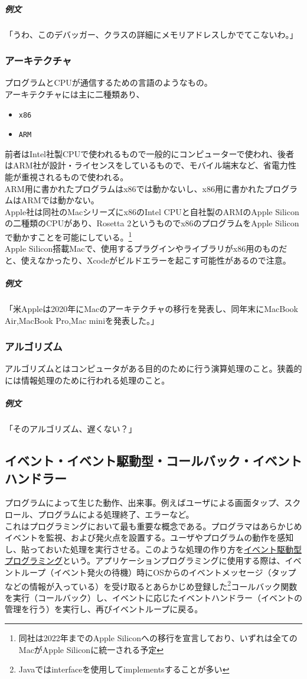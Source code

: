 \documentclass[dvipdfmx,jb5]{jreport}
\newcommand{\terlogy}[2][|]{\colorbox{terlogy}{\texttt{\lstinline#1#2#1}}}
\begin{document}
\subparagraph{例文} 「うわ、このデバッガー、クラスの詳細にメモリアドレスしかでてこないわ。」

\subsubsection{アーキテクチャ}
プログラムとCPUが通信するための言語のようなもの。\\
アーキテクチャには主に二種類あり、
\begin{itemize}
      \item \terlogy{x86}
      \item \terlogy{ARM}
\end{itemize}
前者はIntel社製CPUで使われるもので一般的にコンピューターで使われ、後者はARM社が設計・ライセンスをしているもので、モバイル端末など、省電力性能が重視されるもので使われる。\\
ARM用に書かれたプログラムはx86では動かないし、x86用に書かれたプログラムはARMでは動かない。\\
Apple社は同社のMacシリーズにx86のIntel CPUと自社製のARMのApple Siliconの二種類のCPUがあり、Rosetta 2というものでx86のプログラムをApple Siliconで動かすことを可能にしている。\footnote{同社は2022年までのApple Siliconへの移行を宣言しており、いずれは全てのMacがApple Siliconに統一される予定}\\
Apple Silicon搭載Macで、使用するプラグインやライブラリがx86用のものだと、使えなかったり、Xcodeがビルドエラーを起こす可能性があるので注意。

\subparagraph{例文} 「米Appleは2020年にMacのアーキテクチャの移行を発表し、同年末にMacBook Air,MacBook Pro,Mac miniを発表した。」

\subsubsection{アルゴリズム}
アルゴリズムとはコンピュータがある目的のために行う演算処理のこと。狭義的には情報処理のために行われる処理のこと。

\subparagraph{例文} 「そのアルゴリズム、遅くない？」

\subsection{イベント・イベント駆動型・コールバック・イベントハンドラー}
プログラムによって生じた動作、出来事。例えばユーザによる画面タップ、スクロール、プログラムによる処理終了、エラーなど。
\\

これはプログラミングにおいて最も重要な概念である。プログラマはあらかじめイベントを監視、および発火点を設置する。ユーザやプログラムの動作を感知し、貼っておいた処理を実行させる。このような処理の作り方を\underline{イベント駆動型プログラミング}という。アプリケーションプログラミングに使用する際は、イベントループ（イベント発火の待機）時にOSからのイベントメッセージ（タップなどの情報が入っている）を受け取るとあらかじめ登録した\footnote{Javaではinterfaceを使用してimplementsすることが多い}コールバック関数を実行（コールバック）し、イベントに応じたイベントハンドラー（イベントの管理を行う）を実行し、再びイベントループに戻る。
\end{document}
